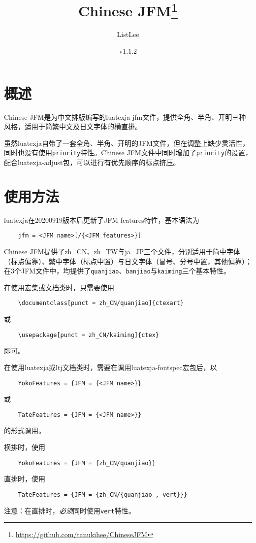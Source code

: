 \documentclass[a4paper , zihao=-4 , fontset=adobe , punct=zh_CN/kaiming]{ctexart}
\title{\textbf{\textsf{Chinese JFM}}\thanks{\url{https://github.com/tanukihee/ChineseJFM}}}
\author{ListLee}
\date{\zhtoday \qquad v1.1.2}
\begin{document}
\maketitle

\section{概述}
\textsf{Chinese JFM}是为中文排版编写的luatexja-jfm文件，提供全角、半角、开明三种风格，适用于简繁中文及日文字体的横直排。

虽然\textsf{luatexja}自带了一套全角、半角、开明的JFM文件，但在调整上缺少灵活性，同时也没有使用\+\verb|priority|特性。\textsf{Chinese JFM}文件中同时增加了\+\verb|priority|的设置，配合\textsf{luatexja-adjust}包，可以进行有优先顺序的标点挤压。\label{sec:pr}

\section{使用方法}
\textsf{luatexja}在20200919版本后更新了JFM features特性，基本语法为
\begin{verbatim}
    jfm = <JFM name>[/{<JFM features>}]
\end{verbatim}

\textsf{Chinese JFM}提供了\textsf{zh\_CN}、\textsf{zh\_TW}与\textsf{ja\_JP}三个文件，分别适用于简中字体（标点偏靠）、繁中字体（标点中置）与日文字体（冒号、分号中置，其他偏靠）；在3个JFM文件中，均提供了\+\verb|quanjiao|、\verb|banjiao|与\+\verb|kaiming|三个基本特性。

在使用\CTeX{}宏集或文档类时，只需要使用
\begin{verbatim}
    \documentclass[punct = zh_CN/quanjiao]{ctexart}
\end{verbatim}
或
\begin{verbatim}
    \usepackage[punct = zh_CN/kaiming]{ctex}
\end{verbatim}
即可。

在使用\textsf{luatexja}或\textsf{ltj}文档类时，需要在调用\textsf{luatexja-fontspec}宏包后，以
\begin{verbatim}
    YokoFeatures = {JFM = {<JFM name>}}
\end{verbatim}
或
\begin{verbatim}
    TateFeatures = {JFM = {<JFM name>}}
\end{verbatim}
的形式调用。

横排时，使用
\begin{verbatim}
    YokoFeatures = {JFM = {zh_CN/quanjiao}}
\end{verbatim}
直排时，使用
\begin{verbatim}
    TateFeatures = {JFM = {zh_CN/{quanjiao , vert}}}
\end{verbatim}
{\color{red}注意：在直排时，\emph{必须}同时使用\+\verb|vert|特性。}
\end{document}
